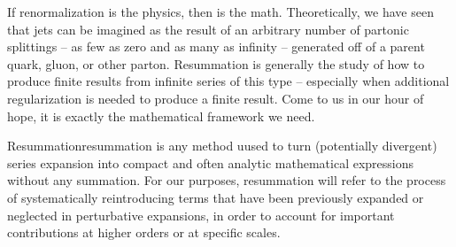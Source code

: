 


If \gls{renormalization} is the physics, then  is the math.
%
%
Theoretically, we have seen that jets can be imagined as the result of an arbitrary number of partonic splittings -- as few as zero and as many as infinity -- generated off of a parent quark, gluon, or other parton.
%
Resummation is generally the study of how to produce finite results from infinite series of this type -- especially when additional regularization is needed to produce a finite result.
%
Come to us in our hour of hope, it is exactly the mathematical framework we need.

\begin{definitionbox}{Resummation}{resummation}
     is any method uused to turn (potentially divergent) series expansion into compact and often analytic mathematical expressions without any summation.
    For our purposes, resummation will refer to the process of systematically reintroducing terms that have been previously expanded or neglected in perturbative expansions, in order to account for important contributions at higher orders or at specific scales.



\end{definitionbox}


